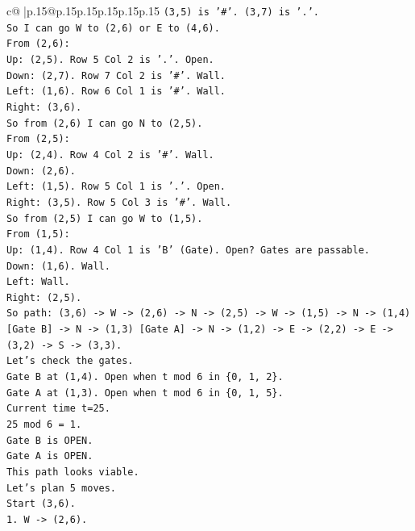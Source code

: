 \documentclass{article}
\begin{document}
{\begin{supertabular}{c@{$\;$}|p{.15\linewidth}@{}p{.15\linewidth}p{.15\linewidth}p{.15\linewidth}p{.15\linewidth}p{.15\linewidth}}
{{{\texttt{(3,5) is '\#'. (3,7) is '.'.} \\
\texttt{So I can go W to (2,6) or E to (4,6).} \\
\texttt{From (2,6):} \\
\texttt{Up: (2,5). Row 5 Col 2 is '.'. Open.} \\
\texttt{Down: (2,7). Row 7 Col 2 is '\#'. Wall.} \\
\texttt{Left: (1,6). Row 6 Col 1 is '\#'. Wall.} \\
\texttt{Right: (3,6).} \\
\texttt{So from (2,6) I can go N to (2,5).} \\
\texttt{From (2,5):} \\
\texttt{Up: (2,4). Row 4 Col 2 is '\#'. Wall.} \\
\texttt{Down: (2,6).} \\
\texttt{Left: (1,5). Row 5 Col 1 is '.'. Open.} \\
\texttt{Right: (3,5). Row 5 Col 3 is '\#'. Wall.} \\
\texttt{So from (2,5) I can go W to (1,5).} \\
\texttt{From (1,5):} \\
\texttt{Up: (1,4). Row 4 Col 1 is 'B' (Gate). Open? Gates are passable.} \\
\texttt{Down: (1,6). Wall.} \\
\texttt{Left: Wall.} \\
\texttt{Right: (2,5).} \\
\texttt{So path: (3,6) {-}> W {-}> (2,6) {-}> N {-}> (2,5) {-}> W {-}> (1,5) {-}> N {-}> (1,4) {[}Gate B{]} {-}> N {-}> (1,3) {[}Gate A{]} {-}> N {-}> (1,2) {-}> E {-}> (2,2) {-}> E {-}> (3,2) {-}> S {-}> (3,3).} \\
\texttt{Let's check the gates.} \\
\texttt{Gate B at (1,4). Open when t mod 6 in \{0, 1, 2\}.} \\
\texttt{Gate A at (1,3). Open when t mod 6 in \{0, 1, 5\}.} \\
\texttt{Current time t=25.} \\
\texttt{25 mod 6 = 1.} \\
\texttt{Gate B is OPEN.} \\
\texttt{Gate A is OPEN.} \\
\texttt{This path looks viable.} \\
\texttt{Let's plan 5 moves.} \\
\texttt{Start (3,6).} \\
\texttt{1. W {-}> (2,6).} \\
}}}
\end{supertabular}}
\end{document}

